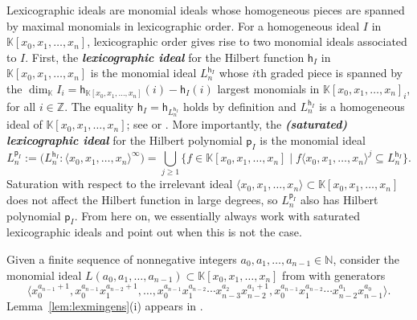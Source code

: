 \documentclass[12pt]{amsart}%
\theoremstyle{definition}%
\newcommand{\hf}{\mathsf{h}}%
\newcommand{\hp}{\mathsf{p}}%
\newcommand{\kk}{\mathbb{K}}%
\newcommand{\NN}{\mathbb{N}}%
\newcommand{\ZZ}{\mathbb{Z}}%
\begin{document}
Lexicographic ideals are monomial ideals whose homogeneous pieces are
spanned by maximal monomials in lexicographic order.  For a
homogeneous ideal $I$ in $\kk[x_0, x_1, \dotsc, x_n]$, lexicographic
order gives rise to two monomial ideals associated to $I$.  First, the
\emph{\bfseries lexicographic ideal} for the Hilbert function $\hf_I$
in $\kk[x_0, x_1, \dotsc, x_n]$ is the monomial ideal $L^{\hf_I}_n$
whose $i$th graded piece is spanned by the $\dim_{\kk} I_i =
\hf_{\kk[x_0, x_1, \dotsc, x_n]}(i) - \hf_I(i)$ largest monomials in
$\kk[x_0, x_1, \dotsc, x_n]_i$, for all $i \in \ZZ$.  The equality
$\hf_I = \hf_{L^{\hf_I}_n}$ holds by definition and $L^{\hf_I}_n$ is a
homogeneous ideal of $\kk[x_0, x_1, \dotsc, x_n]$; see
\cite[\S~II]{Macaulay--1927} or
\cite[Proposition~2.21]{Miller--Sturmfels--2005}.  More importantly,
the \emph{\bfseries (saturated) lexicographic ideal} for the Hilbert
polynomial $\hp_I$ is the monomial ideal
\[
L^{\hp_I}_n := \bigl( L^{\hf_I}_n : \langle x_0, x_1, \dotsc, x_{n}
\rangle^{\infty} \bigr) = \bigcup_{j \ge 1} \bigl\{ f \in \kk[x_0,
  x_1, \dotsc, x_n] \mid f \langle x_0, x_1, \dotsc, x_{n} \rangle^{j}
\subseteq L^{\hf_I}_n \bigr\}.
\]
Saturation with respect to the irrelevant ideal $\langle x_0, x_1,
\dotsc, x_{n} \rangle \subset \kk[x_0, x_1, \dotsc, x_n]$ does not
affect the Hilbert function in large degrees, so $L^{\hp_I}_n$ also
has Hilbert polynomial $\hp_I$.  From here on, we essentially always
work with saturated lexicographic ideals and point out when this is
not the case.

Given a finite sequence of nonnegative integers $a_0, a_1, \dotsc,
a_{n-1} \in \NN$, consider the monomial ideal $L(a_0, a_1, \dots,
a_{n-1}) \subset \kk[x_0, x_1, \dotsc, x_n]$ from
\cite[Notation~1.2]{Reeves--Stillman--1997} with generators
\[
\langle x_0^{a_{n-1}+1}, x_0^{a_{n-1}} x_1^{a_{n-2}+1}, \dotsc,
x_{0}^{a_{n-1}} x_{1}^{a_{n-2}} \dotsb x_{n-3}^{a_{2}} x_{n-2}^{a_{1}
  + 1}, x_{0}^{a_{n-1}} x_{1}^{a_{n-2}} \dotsb x_{n-2}^{a_{1}}
x_{n-1}^{a_{0}} \rangle .
\]
Lemma~\ref{lem:lexmingens}(i) appears in
\cite[Theorem~2.23]{Moore--2012}.
\end{document}
